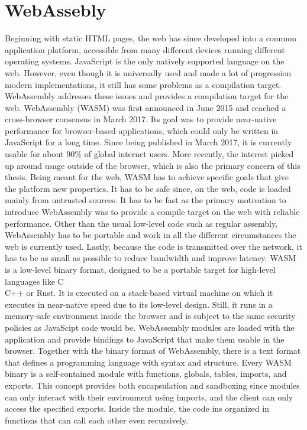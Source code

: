 \section{WebAssebly}
Beginning with static HTML pages, the web has since developed into a common application platform, accessible from many different devices running different operating systems. JavaScript is the only natively supported language on the web. However, even though it is universally used and made a lot of progression modern implementations, it still has some problems as a compilation target. WebAssembly addresses these issues and provides a compilation target for the web.
WebAssembly (WASM) was first announced in June 2015 and reached a cross-browser consensus in March 2017. Its goal was to provide near-native performance for browser-based applications, which could only be written in JavaScript for a long time. Since being published in March 2017, it is currently usable for about 90\% of global internet users. More recently, the interest picked up around usage outside of the browser, which is also the primary concern of this thesis.
Being meant for the web, WASM has to achieve specific goals that give the platform new properties. It has to be safe since, on the web, code is loaded mainly from untrusted sources. It has to be fast as the primary motivation to introduce WebAssembly was to provide a compile target on the web with reliable performance. Other than the usual low-level code such as regular assembly, WebAssembly has to be portable and work in all the different circumstances the web is currently used. Lastly, because the code is transmitted over the network, it has to be as small as possible to reduce bandwidth and improve latency.
WASM is a low-level binary format, designed to be a portable target for high-level languages like C\\C++ or Rust. It is executed on a stack-based virtual machine on which it executes in near-native speed due to its low-level design. Still, it runs in a memory-safe environment inside the browser and is subject to the same security policies as JavaScipt code would be. WebAssembly modules are loaded with the application and provide bindings to JavaScript that make them usable in the browser.
Together with the binary format of WebAssembly, there is a text format that defines a programming language with syntax and structure. Every WASM binary is a self-contained module with functions, globals, tables, imports, and exports. This concept provides both encapsulation and sandboxing since modules can only interact with their environment using imports, and the client can only access the specified exports. Inside the module, the code ins organized in functions that can call each other even recursively.
